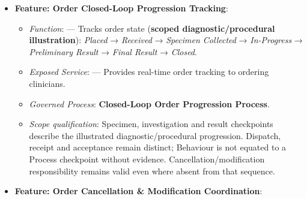 \begin{itemize}
\begin{itemize}
\begin{itemize}
\item
\emph{Function}: \texttt{} — Evaluates order routing rules to determine target laboratory, imaging centre, or procedural unit.



\item
\emph{Exposed Service}: \texttt{} — Transmits orders to performing diagnostic systems.



\end{itemize}


\item
\textbf{Feature: Order Closed-Loop Progression Tracking}:


\begin{itemize}

\item
\emph{Function}: \texttt{} — Tracks order state (\textbf{scoped diagnostic/\allowbreak{}procedural illustration}): \emph{Placed} → \emph{Received} → \emph{Specimen Collected} → \emph{In-Progress} → \emph{Preliminary Result} → \emph{Final Result} → \emph{Closed}.



\item
\emph{Exposed Service}: \texttt{} — Provides real-time order tracking to ordering clinicians.



\item
\emph{Governed Process}: \textbf{Closed-Loop Order Progression Process}.



\item
\emph{Scope qualification}: Specimen, investigation and result checkpoints describe the illustrated diagnostic/\allowbreak{}procedural progression. Dispatch, receipt and acceptance remain distinct; Behaviour \texttt{} is not equated to a Process checkpoint without evidence. Cancellation/\allowbreak{}modification responsibility remains valid even where absent from that sequence.



\end{itemize}


\item
\textbf{Feature: Order Cancellation \& Modification Coordination}:


\begin{itemize}


\end{itemize}
\end{itemize}
\end{itemize}
